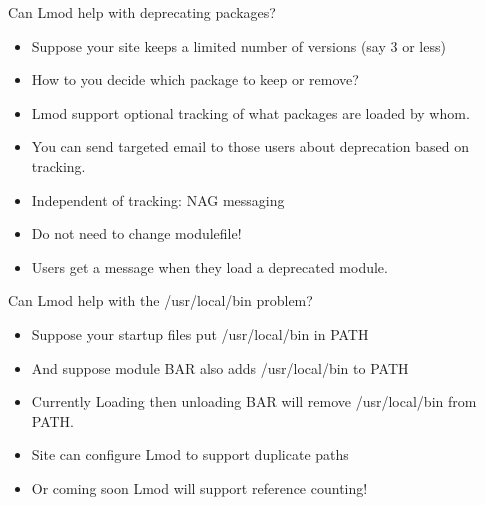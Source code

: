 \documentclass{beamer}
\begin{document}
\begin{frame}{Can Lmod help with deprecating packages?}
  \begin{itemize}
    \item Suppose your site keeps a limited number of versions (say 3
      or less)
    \item How to you decide which package to keep or remove?
    \item Lmod support optional tracking of what packages are loaded
      by whom.
    \item You can send targeted email to those users about
      deprecation based on tracking.
    \item Independent of tracking: NAG messaging
    \item Do not need to change modulefile!
    \item Users get a message when they load a deprecated module. 
  \end{itemize}
\end{frame}

\begin{frame}{Can Lmod help with the /usr/local/bin problem?}
  \begin{itemize}
    \item Suppose your startup files put /usr/local/bin in PATH
    \item And suppose module BAR also adds /usr/local/bin to PATH
    \item Currently Loading then unloading BAR will remove
      /usr/local/bin from PATH. 
    \item Site can configure Lmod to support duplicate paths
    \item Or coming soon Lmod will support reference counting!
  \end{itemize}
\end{frame}
\end{document}
